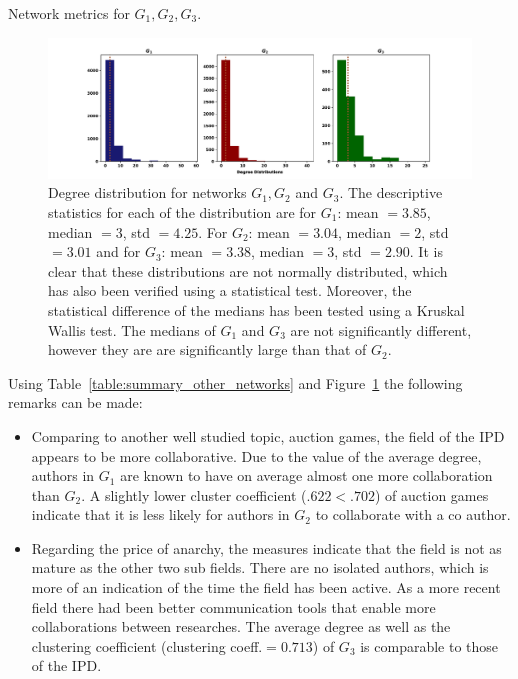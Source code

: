 \documentclass{article}
\theoremstyle{definition}
\begin{document}
\begin{table}[!hbtp]
    \centering
    \resizebox{\textwidth}{!}{
    }
    \caption{Network metrics for \(G_1, G_2, G_3\).}\label{table:summary_other_networks}
\end{table}

\begin{figure}[!hbtp]
    \centering
    \includegraphics[width=\textwidth]{./assets/images/networks_ditributions.pdf}
    \caption{Degree distribution for networks \(G_1, G_2\) and \(G_3\). The descriptive
    statistics for each of the distribution are for \(G_1\): mean \(=3.85\),
    median \(=3\), std \(=4.25\). For \(G_2\): mean \(=3.04\), median \(=2\),
    std \(=3.01\) and for \(G_3\): mean \(=3.38\), median \(=3\), std \(=2.90\).
    It is clear that these distributions are not normally distributed, which has
    also been verified using a statistical test. Moreover, the statistical difference
    of the medians has been tested using a Kruskal Wallis test. The medians
    of \(G_1\) and \(G_3\) are not significantly different, however they are
    are significantly large than that of \(G_2\).}\label{fig:degree_distrs}
\end{figure}

Using Table~\ref{table:summary_other_networks} and Figure~\ref{fig:degree_distrs}
the following remarks can be made:

\begin{itemize}
    \item Comparing to another well studied topic, auction games, the field of the
    IPD appears to be more collaborative. Due to the
    value of the average degree, authors in \(G_1\) are known to have on average almost
    one more collaboration than \(G_2\). A slightly lower cluster coefficient ($ .622 < .702$)
    of auction games indicate that it is less likely for authors in \(G_2\) to collaborate
    with a co author.
    \item Regarding the price of anarchy, the measures indicate that the field
    is not as mature as the other two sub fields. There are no isolated authors,
    which is more of an indication of the time the field has been active. As a
    more recent field there had been better communication tools that enable more
    collaborations between researches. The average degree as well as the clustering
    coefficient (clustering coeff.$=0.713$) of \(G_3\) is comparable to those
    of the IPD.
\end{itemize}
\end{document}
